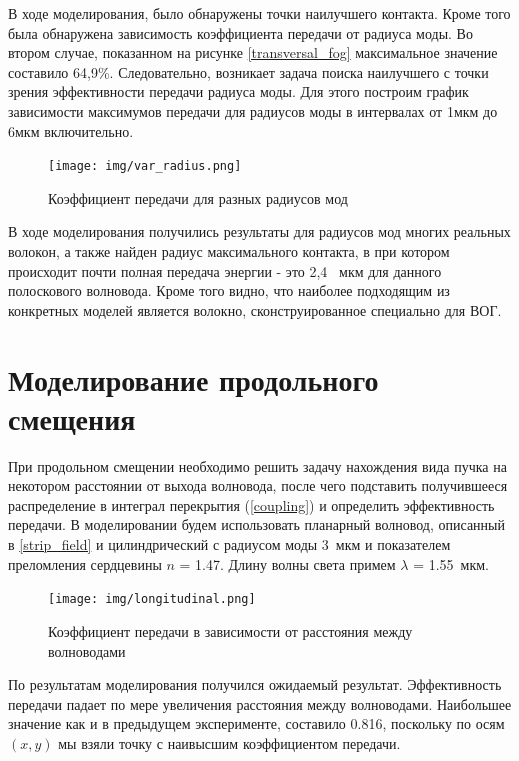В ходе моделирования, было обнаружены точки наилучшего контакта. Кроме того была обнаружена зависимость коэффициента передачи от радиуса моды. Во втором случае, показанном на рисунке \ref{transversal_fog} максимальное значение составило 64,9\%. Следовательно, возникает задача поиска наилучшего с точки зрения эффективности передачи радиуса моды. Для этого построим график зависимости максимумов передачи для радиусов моды в интервалах от 1мкм до 6мкм включительно.
\begin{figure}[h!]
		\texttt{[image: img/var\_radius.png]}
		\caption{Коэффициент передачи для разных радиусов мод}
\end{figure}

В ходе моделирования получились результаты для радиусов мод многих реальных волокон, а также найден радиус максимального контакта, в при котором происходит почти полная передача энергии - это 2,4~ мкм для данного полоскового волновода. Кроме того видно, что наиболее подходящим из конкретных моделей является волокно, сконструированное специально для ВОГ.

\section{Моделирование продольного смещения}

При продольном смещении необходимо решить задачу нахождения вида пучка на некотором расстоянии от выхода волновода, после чего подставить получившееся распределение в интеграл перекрытия (\ref{coupling}) и определить эффективность передачи.
В моделировании будем использовать планарный волновод, описанный в \ref{strip_field} и цилиндрический с радиусом моды 3~мкм и показателем преломления сердцевины $n$ = 1.47. Длину волны света примем $\lambda$ = 1.55~мкм.

\begin{figure}[h!]
	\texttt{[image: img/longitudinal.png]}
	\caption{Коэффициент передачи в зависимости от расстояния между волноводами}
	\label{longitudinal}
\end{figure}

По результатам моделирования получился ожидаемый результат. Эффективность передачи падает по мере увеличения расстояния между волноводами. Наибольшее значение как и в предыдущем эксперименте, составило 0.816, поскольку по осям $(x,y)$ мы взяли точку с наивысшим коэффициентом передачи.   